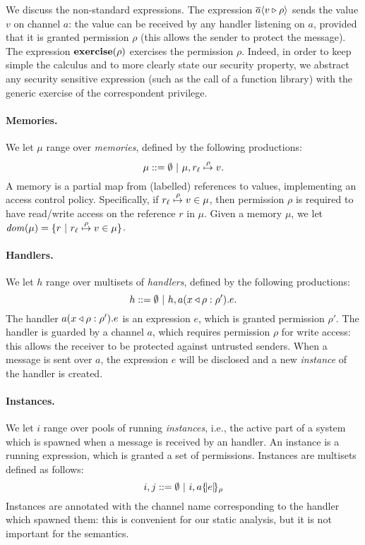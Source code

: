 We discuss the non-standard expressions.  The expression
$\send{a}{v}{\rho}$ sends the value $v$ on channel $a$: the value can
be received by any handler listening on $a$, provided that it is
granted permission $\rho$ (this allows the sender to protect the
message). The expression $\exercise{\rho}$ exercises the permission
$\rho$. Indeed, in order to keep simple the calculus and to more
clearly state our security property, we abstract any
security sensitive expression (such as the call of a function library)
with the generic exercise of the correspondent privilege. 

\paragraph*{Memories.}
We let $\mu$ range over \emph{memories}, defined by the following productions:
\[
\mu ::= \emptyset ~|~ \mu, \map{r_{\ell}}{\rho}{v}.
\]
A memory is a partial map from (labelled) references to values, implementing an access control policy. Specifically, if $\map{r_{\ell}}{\rho}{v} \in \mu$, then permission $\rho$ is required to have read/write access on the reference $r$ in $\mu$. Given a memory $\mu$, we let $\dom(\mu) = \{r ~|~ \map{r_{\ell}}{\rho}{v} \in \mu\}$.

\paragraph*{Handlers.} 
We let $h$ range over multisets of \emph{handlers}, defined by the following productions:
\[
h ::= \emptyset ~|~ h,\handler{a}{x}{\rho}{e}{\rho'}.
\]
The handler $\handler{a}{x}{\rho}{e}{\rho'}$ is an expression $e$, which is granted permission $\rho'$. The handler is guarded by a channel $a$, which requires permission $\rho$ for write access: this allows the receiver to be protected against untrusted senders. When a message is sent over $a$, the expression $e$ will be disclosed and a new \emph{instance} of the handler is created.

\paragraph*{Instances.} 
We let $i$ range over pools of running \emph{instances}, i.e., the active part of a system which is spawned when a message is received by an handler. An instance is a running expression, which is granted a set of permissions. Instances are multisets defined as follows:
\[
i,j ::= \emptyset ~|~ i,\inst{a}{e}{\rho}
\]
Instances are annotated with the channel name corresponding to the handler which spawned them: this is convenient for our static analysis, but it is not important for the semantics.

